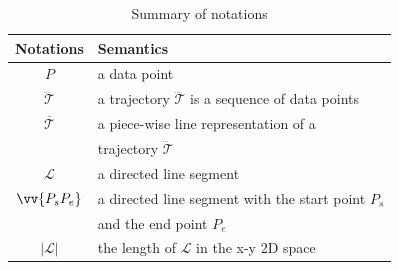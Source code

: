 
\begin{table}
	\renewcommand{\arraystretch}{1.35}
	\caption{\small Summary of notations}
	\centering
	\footnotesize
	\begin{tabular}{|c|l|}
		\hline
		{\bf Notations}& {\bf Semantics}   \\
		\hline %
		$P$ & a data point \\
		\hline
		$\dddot{\mathcal{T}}$ & a trajectory $\dddot{\mathcal{T}}$ is a sequence of data points\\
		\hline
		$\overline{\mathcal{T}}$&  {a piece-wise line representation of a }	\\
								& trajectory $\dddot{\mathcal{T}}$		\\
		\hline
		$\mathcal{L}$ & a directed line segment  \\


\hline
		$\vv{P_{s}P_{e}}$ & a directed line segment with the start point $P_s$ \\
        & and the end point $P_e$	\\
        \hline
$|\mathcal{L}|$ &  the length of $\mathcal{L}$ in the x-y 2D space  \\



\end{tabular}
\end{table}
